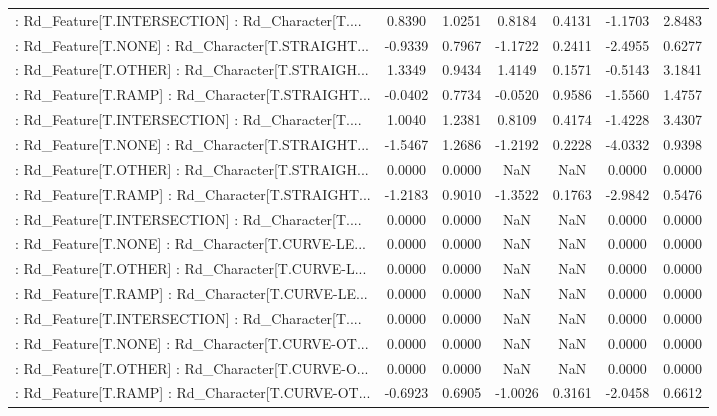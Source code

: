 \begin{longtable}{p{4cm}cccccc}
 : Rd\_Feature[T.INTERSECTION] : Rd\_Character[T.... &  0.8390 &    1.0251 &  0.8184 &       0.4131 & -1.1703 &  2.8483 \\
 : Rd\_Feature[T.NONE] : Rd\_Character[T.STRAIGHT... & -0.9339 &    0.7967 & -1.1722 &       0.2411 & -2.4955 &  0.6277 \\
 : Rd\_Feature[T.OTHER] : Rd\_Character[T.STRAIGH... &  1.3349 &    0.9434 &  1.4149 &       0.1571 & -0.5143 &  3.1841 \\
 : Rd\_Feature[T.RAMP] : Rd\_Character[T.STRAIGHT... & -0.0402 &    0.7734 & -0.0520 &       0.9586 & -1.5560 &  1.4757 \\
 : Rd\_Feature[T.INTERSECTION] : Rd\_Character[T.... &  1.0040 &    1.2381 &  0.8109 &       0.4174 & -1.4228 &  3.4307 \\
 : Rd\_Feature[T.NONE] : Rd\_Character[T.STRAIGHT... & -1.5467 &    1.2686 & -1.2192 &       0.2228 & -4.0332 &  0.9398 \\
 : Rd\_Feature[T.OTHER] : Rd\_Character[T.STRAIGH... &  0.0000 &    0.0000 &     NaN &          NaN &  0.0000 &  0.0000 \\
 : Rd\_Feature[T.RAMP] : Rd\_Character[T.STRAIGHT... & -1.2183 &    0.9010 & -1.3522 &       0.1763 & -2.9842 &  0.5476 \\
 : Rd\_Feature[T.INTERSECTION] : Rd\_Character[T.... &  0.0000 &    0.0000 &     NaN &          NaN &  0.0000 &  0.0000 \\
 : Rd\_Feature[T.NONE] : Rd\_Character[T.CURVE-LE... &  0.0000 &    0.0000 &     NaN &          NaN &  0.0000 &  0.0000 \\
 : Rd\_Feature[T.OTHER] : Rd\_Character[T.CURVE-L... &  0.0000 &    0.0000 &     NaN &          NaN &  0.0000 &  0.0000 \\
 : Rd\_Feature[T.RAMP] : Rd\_Character[T.CURVE-LE... &  0.0000 &    0.0000 &     NaN &          NaN &  0.0000 &  0.0000 \\
 : Rd\_Feature[T.INTERSECTION] : Rd\_Character[T.... &  0.0000 &    0.0000 &     NaN &          NaN &  0.0000 &  0.0000 \\
 : Rd\_Feature[T.NONE] : Rd\_Character[T.CURVE-OT... &  0.0000 &    0.0000 &     NaN &          NaN &  0.0000 &  0.0000 \\
 : Rd\_Feature[T.OTHER] : Rd\_Character[T.CURVE-O... &  0.0000 &    0.0000 &     NaN &          NaN &  0.0000 &  0.0000 \\
 : Rd\_Feature[T.RAMP] : Rd\_Character[T.CURVE-OT... & -0.6923 &    0.6905 & -1.0026 &       0.3161 & -2.0458 &  0.6612 \\

\end{longtable}
